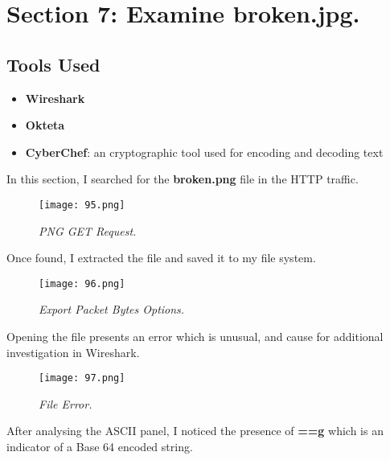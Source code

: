 \section{Section 7: Examine \textbf{broken.jpg}.}
\subsection{Tools Used}
\begin{itemize}
    \item \textbf{Wireshark}
    \item \textbf{Okteta}
    \item \textbf{CyberChef}: an cryptographic tool used for encoding and decoding text
\end{itemize}

In this section, I searched for the \textbf{broken.png} file in the HTTP traffic.

\begin{figure}[H]
    \setlength{\abovecaptionskip}{20pt}
    \setlength{\belowcaptionskip}{0pt}
    \centering
    \texttt{[image: 95.png]}
    \captionsetup{justification=centering}
    \caption{\textit{PNG GET Request.}}
    \label{fig:95}
\end{figure}
\vspace{-10pt}

Once found, I extracted the file and saved it to my file system.

\begin{figure}[H]
    \setlength{\abovecaptionskip}{20pt}
    \setlength{\belowcaptionskip}{0pt}
    \centering
    \texttt{[image: 96.png]}
    \captionsetup{justification=centering}
    \caption{\textit{Export Packet Bytes Options.}}
    \label{fig:96}
\end{figure}
\vspace{-10pt}

Opening the file presents an error which is unusual, and cause for additional investigation in Wireshark.

\begin{figure}[H]
    \setlength{\abovecaptionskip}{20pt}
    \setlength{\belowcaptionskip}{0pt}
    \centering
    \texttt{[image: 97.png]}
    \captionsetup{justification=centering}
    \caption{\textit{File Error.}}
    \label{fig:97}
\end{figure}
\vspace{-10pt}

After analysing the ASCII panel, I noticed the presence of \textbf{==g} which is an indicator of a Base 64 encoded string.

